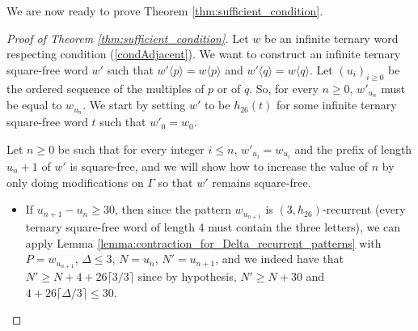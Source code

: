 \documentclass[12pt]{article}
\theoremstyle{definition}
\newcommand{\subsequence}[2]{#1\langle#2\rangle}
\begin{document}
We are now ready to prove Theorem \ref{thm:sufficient_condition}.
\begin{proof}[Proof of Theorem \ref{thm:sufficient_condition}]

Let $w$ be an infinite ternary word respecting condition (\ref{condAdjacent}). We want to construct an infinite ternary square-free word $w'$ such that $\subsequence{w'}{p} =\subsequence{w}{p}$ and $\subsequence{w'}{q} = \subsequence{w}{q}$. Let $(u_i)_{i \ge 0}$ be the ordered sequence of the multiples of $p$ or of $q$. So, for every $n \ge 0$, $w'_{u_n}$ must be equal to $w_{u_n}$. We start by setting $w'$ to be $h_{26}(t)$ for some infinite ternary square-free word $t$ such that $w'_0 = w_0$. 

Let $n \ge 0$ be such that for every integer $i \le n$, $w'_{u_i}  = w_{u_i}$ and the prefix of length $u_n + 1$ of $w'$ is square-free, and we will show how to increase the value of $n$ by only doing modifications on $\Gamma$ so that $w'$ remains square-free.
\begin{itemize}
    \item If $u_{n + 1} - u_{n} \ge 30$, then since the pattern $w_{u_{n + 1}}$ is $(3, h_{26})$-recurrent (every ternary square-free word of length $4$ must contain the three letters), we can apply Lemma \ref{lemma:contraction_for_Delta_recurrent_patterns} with $P = w_{u_{n + 1}}$, $\Delta \le 3$, $N = u_n$, $N' = u_{n + 1}$, and we indeed have that $N' \ge N + 4 + 26\lceil3/3\rceil$ since by hypothesis, $N' \ge N + 30$ and $4 + 26\lceil\Delta/3\rceil \le 30$.


\end{itemize}
\end{proof}
\end{document}
